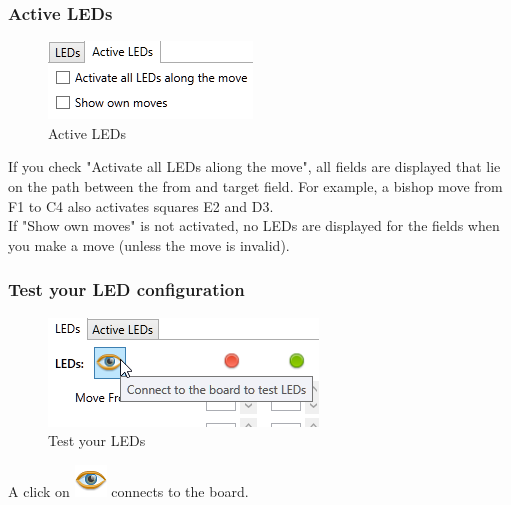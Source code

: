 \documentclass[11pt,a4paper]{article}
\begin{document}
\subsubsection{Active LEDs}

\begin{figure}[H]
	\centering
	\includegraphics[scale=1.0]{iChessOne4.png}
	\caption{Active LEDs }
	\label{fig:iChessOne7}
\end{figure}
If you check "Activate all LEDs aliong the move", all fields are displayed that lie on the path between the from and target field. For example, a bishop move from F1 to C4 also activates squares E2 and D3.\\
If "Show own moves" is not activated, no LEDs are displayed for the fields when you make a move (unless the move is invalid).

\subsubsection{Test your LED configuration}

\begin{figure}[H]
	\centering
	\includegraphics[scale=1.0]{iChessOne5.png}
	\caption{Test your LEDs }
	\label{fig:iChessOne8}
\end{figure}

A click on \includegraphics[scale=0.4]{eye.png} connects to the board.
\end{document}
